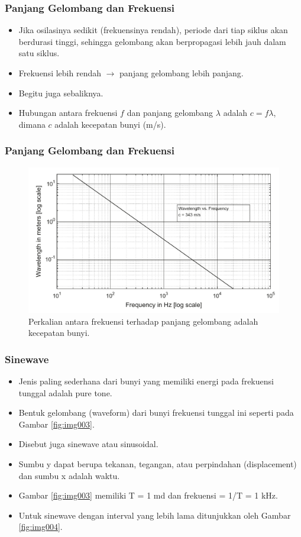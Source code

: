 \documentclass[pdflatex,compress]{beamer}
\begin{document}
\begin{frame}
	\frametitle{Panjang Gelombang dan Frekuensi}
	\begin{itemize}
		\item Jika osilasinya sedikit (frekuensinya rendah), periode dari tiap siklus akan berdurasi tinggi, sehingga gelombang akan berpropagasi lebih jauh dalam satu siklus.
		\item Frekuensi lebih rendah $\rightarrow$ panjang gelombang lebih panjang.
		\item Begitu juga sebaliknya.
		\item Hubungan antara frekuensi $ f $ dan panjang gelombang $ \lambda $ adalah $ c = f\lambda $, dimana $ c $ adalah kecepatan bunyi (m/s).
	\end{itemize}
\end{frame}

\begin{frame}
	\frametitle{Panjang Gelombang dan Frekuensi}
	\begin{figure}
		\centering
		\includegraphics[width=0.9\linewidth]{img/img002}
		\caption{Perkalian antara frekuensi terhadap panjang gelombang adalah kecepatan bunyi.}
		\label{fig:img002}
	\end{figure}
\end{frame}

\begin{frame}
	\frametitle{Sinewave}
	\begin{itemize}
		\item Jenis paling sederhana dari bunyi yang memiliki energi pada frekuensi tunggal adalah pure tone.
		\item Bentuk gelombang (waveform) dari bunyi frekuensi tunggal ini seperti pada Gambar \ref{fig:img003}.
		\item Disebut juga sinewave atau sinusoidal.
		\item Sumbu y dapat berupa tekanan, tegangan, atau perpindahan (displacement) dan sumbu x adalah waktu.
		\item Gambar \ref{fig:img003} memiliki T = 1 md dan frekuensi = 1/T = 1 kHz.
		\item Untuk sinewave dengan interval yang lebih lama ditunjukkan oleh Gambar \ref{fig:img004}.
	\end{itemize}
\end{frame}
\end{document}
